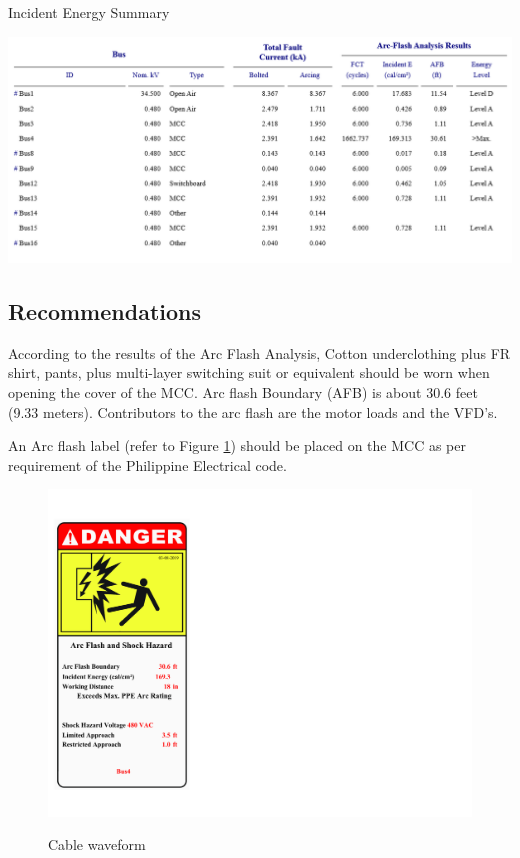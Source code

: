 \begin{table}[!htb]
	\caption{Incident Energy Summary}
	\label{tbl_ch04_elecaudit_incidenenergysummary}
		\includegraphics[width=\textwidth]{tables/tbl_ch04_elecaudit_incidenenergysummary} \\	
	
\end{table}


\subsection{Recommendations}
According to the results of the Arc Flash Analysis, Cotton underclothing plus FR shirt, pants, plus multi-layer switching suit or equivalent should be worn when opening the cover of the MCC. Arc flash Boundary (AFB)  is about 30.6 feet (9.33 meters).  Contributors to the arc flash are the motor loads and the VFD’s.

An Arc flash label (refer to Figure \ref{fig_ch04_elecaudit_arflashlable}) should be placed on the MCC as per requirement of the Philippine Electrical code.

\begin{figure}[!htb]
	\includegraphics[scale=0.5]{figures/ARC1_3_5X7_Danger1_Bus.pdf} \\
	\caption{Cable waveform}
	\label{fig_ch04_elecaudit_arflashlable} 
\end{figure}



